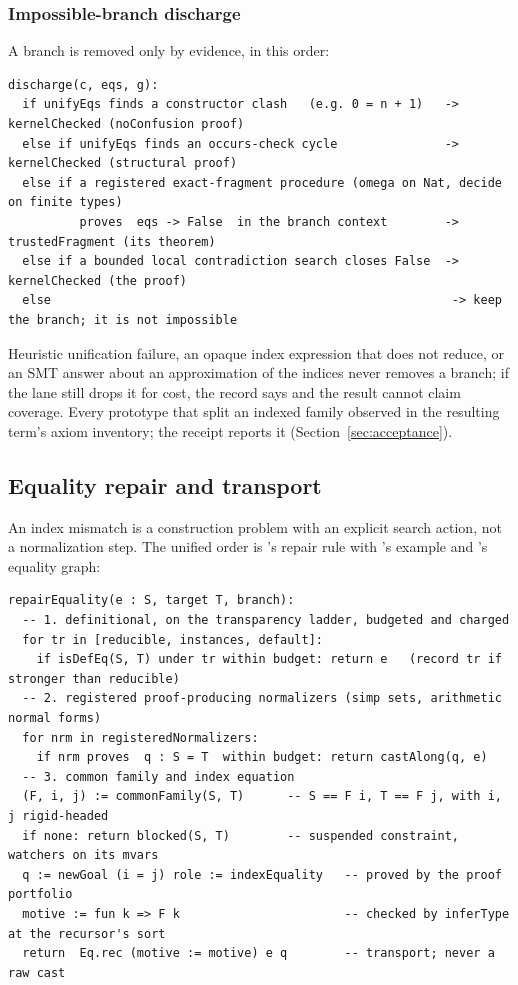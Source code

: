 \subsubsection{Impossible-branch discharge}

A branch is removed only by evidence, in this order:

\begin{lstlisting}
discharge(c, eqs, g):
  if unifyEqs finds a constructor clash   (e.g. 0 = n + 1)   -> kernelChecked (noConfusion proof)
  else if unifyEqs finds an occurs-check cycle               -> kernelChecked (structural proof)
  else if a registered exact-fragment procedure (omega on Nat, decide on finite types)
          proves  eqs -> False  in the branch context        -> trustedFragment (its theorem)
  else if a bounded local contradiction search closes False  -> kernelChecked (the proof)
  else                                                        -> keep the branch; it is not impossible
\end{lstlisting}

Heuristic unification failure, an opaque index expression that does not reduce, or an SMT answer about an approximation of the indices never removes a branch; if the lane still drops it for cost, the record says  and the result cannot claim coverage. Every prototype that split an indexed family observed  in the resulting term's axiom inventory; the receipt reports it (Section~\ref{sec:acceptance}).

\subsection{Equality repair and transport}\label{alg:transport}

An index mismatch is a construction problem with an explicit search action, not a normalization step. The unified order is 's repair rule with 's example and 's equality graph:

\begin{lstlisting}
repairEquality(e : S, target T, branch):
  -- 1. definitional, on the transparency ladder, budgeted and charged
  for tr in [reducible, instances, default]:
    if isDefEq(S, T) under tr within budget: return e   (record tr if stronger than reducible)
  -- 2. registered proof-producing normalizers (simp sets, arithmetic normal forms)
  for nrm in registeredNormalizers:
    if nrm proves  q : S = T  within budget: return castAlong(q, e)
  -- 3. common family and index equation
  (F, i, j) := commonFamily(S, T)      -- S == F i, T == F j, with i, j rigid-headed
  if none: return blocked(S, T)        -- suspended constraint, watchers on its mvars
  q := newGoal (i = j) role := indexEquality   -- proved by the proof portfolio
  motive := fun k => F k                       -- checked by inferType at the recursor's sort
  return  Eq.rec (motive := motive) e q        -- transport; never a raw cast
\end{lstlisting}

